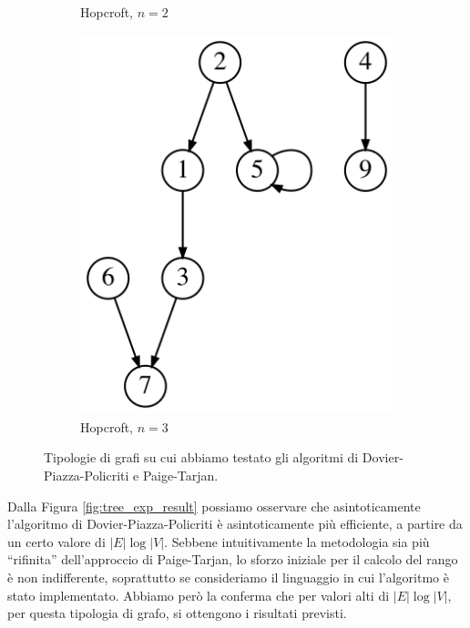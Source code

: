 \begin{figure}
\begin{subfigure}[b]{0.1\textwidth}
        \caption{Hopcroft, $n=2$}
        \label{fig:hopcroft_graph_1}
    \end{subfigure}
    \qquad \qquad
    \begin{subfigure}[b]{0.2\textwidth}
        \centering
        \includegraphics[width=\textwidth]{./sezione3/experimental_results/plots/hopcroft_graph_2.png}
        \caption{Hopcroft, $n=3$}
        \label{fig:hopcroft_graph_2}
    \end{subfigure}
    \caption{Tipologie di grafi su cui abbiamo testato gli algoritmi di Dovier-Piazza-Policriti e Paige-Tarjan.}
\end{figure}

Dalla Figura \ref{fig:tree_exp_result} possiamo osservare che asintoticamente l'algoritmo di Dovier-Piazza-Policriti è asintoticamente più efficiente, a partire da un certo valore di $|E| \log |V|$. Sebbene intuitivamente la metodologia sia più ``rifinita'' dell'approccio di Paige-Tarjan, lo sforzo iniziale per il calcolo del rango è non indifferente, soprattutto se consideriamo il linguaggio in cui l'algoritmo è stato implementato. Abbiamo però la conferma che per valori alti di $|E| \log |V|$, per questa tipologia di grafo, si ottengono i risultati previsti.

